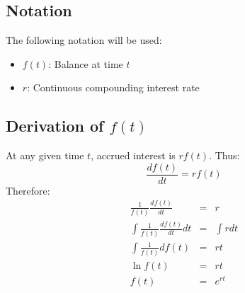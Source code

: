 \subsection{Notation}
The following notation will be used:
\begin{itemize}
    \item
    $f(t)$: Balance at time $t$
    \item
    $r$: Continuous compounding interest rate
\end{itemize}
\subsection{Derivation of $f(t)$}
At any given time $t$, accrued interest is $rf(t)$. Thus:
\[\frac{df(t)}{dt}=rf(t)\]
Therefore:
\[
    \begin{array}{lcl}
        \frac{1}{f(t)}\frac{df(t)}{dt} &= &r\\
        \int{\frac{1}{f(t)}\frac{df(t)}{dt}}{dt} &= &\int{r}{dt}\\
        \int{\frac{1}{f(t)}}{df(t)} &= &rt\\
        \ln{f(t)} &= &rt\\
        f(t) &= &e^{rt}\\
    \end{array}
\]
